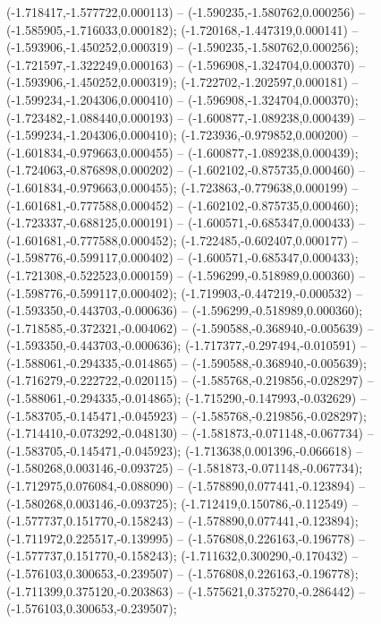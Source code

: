  (-1.718417,-1.577722,0.000113) -- (-1.590235,-1.580762,0.000256) -- (-1.585905,-1.716033,0.000182);
 (-1.720168,-1.447319,0.000141) -- (-1.593906,-1.450252,0.000319) -- (-1.590235,-1.580762,0.000256);
 (-1.721597,-1.322249,0.000163) -- (-1.596908,-1.324704,0.000370) -- (-1.593906,-1.450252,0.000319);
 (-1.722702,-1.202597,0.000181) -- (-1.599234,-1.204306,0.000410) -- (-1.596908,-1.324704,0.000370);
 (-1.723482,-1.088440,0.000193) -- (-1.600877,-1.089238,0.000439) -- (-1.599234,-1.204306,0.000410);
 (-1.723936,-0.979852,0.000200) -- (-1.601834,-0.979663,0.000455) -- (-1.600877,-1.089238,0.000439);
 (-1.724063,-0.876898,0.000202) -- (-1.602102,-0.875735,0.000460) -- (-1.601834,-0.979663,0.000455);
 (-1.723863,-0.779638,0.000199) -- (-1.601681,-0.777588,0.000452) -- (-1.602102,-0.875735,0.000460);
 (-1.723337,-0.688125,0.000191) -- (-1.600571,-0.685347,0.000433) -- (-1.601681,-0.777588,0.000452);
 (-1.722485,-0.602407,0.000177) -- (-1.598776,-0.599117,0.000402) -- (-1.600571,-0.685347,0.000433);
 (-1.721308,-0.522523,0.000159) -- (-1.596299,-0.518989,0.000360) -- (-1.598776,-0.599117,0.000402);
 (-1.719903,-0.447219,-0.000532) -- (-1.593350,-0.443703,-0.000636) -- (-1.596299,-0.518989,0.000360);
 (-1.718585,-0.372321,-0.004062) -- (-1.590588,-0.368940,-0.005639) -- (-1.593350,-0.443703,-0.000636);
 (-1.717377,-0.297494,-0.010591) -- (-1.588061,-0.294335,-0.014865) -- (-1.590588,-0.368940,-0.005639);
 (-1.716279,-0.222722,-0.020115) -- (-1.585768,-0.219856,-0.028297) -- (-1.588061,-0.294335,-0.014865);
 (-1.715290,-0.147993,-0.032629) -- (-1.583705,-0.145471,-0.045923) -- (-1.585768,-0.219856,-0.028297);
 (-1.714410,-0.073292,-0.048130) -- (-1.581873,-0.071148,-0.067734) -- (-1.583705,-0.145471,-0.045923);
 (-1.713638,0.001396,-0.066618) -- (-1.580268,0.003146,-0.093725) -- (-1.581873,-0.071148,-0.067734);
 (-1.712975,0.076084,-0.088090) -- (-1.578890,0.077441,-0.123894) -- (-1.580268,0.003146,-0.093725);
 (-1.712419,0.150786,-0.112549) -- (-1.577737,0.151770,-0.158243) -- (-1.578890,0.077441,-0.123894);
 (-1.711972,0.225517,-0.139995) -- (-1.576808,0.226163,-0.196778) -- (-1.577737,0.151770,-0.158243);
 (-1.711632,0.300290,-0.170432) -- (-1.576103,0.300653,-0.239507) -- (-1.576808,0.226163,-0.196778);
 (-1.711399,0.375120,-0.203863) -- (-1.575621,0.375270,-0.286442) -- (-1.576103,0.300653,-0.239507);
